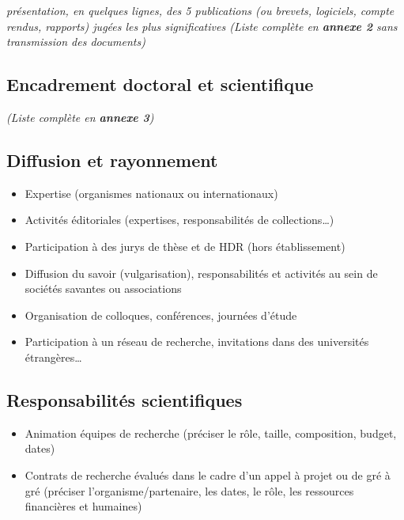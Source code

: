 \documentclass[a4paper,12pt]{article}
\newcommand{\instructions}[1]{{\color{black}#1}}
\begin{document}
\instructions{%
	{\em
	présentation, en quelques lignes, des 5 publications (ou brevets, logiciels, compte rendus, rapports) jugées les plus significatives (Liste complète en \textbf{annexe 2} sans transmission des documents)
	}
}


\subsection{Encadrement doctoral et scientifique}


\instructions{%
	{\em
	(Liste complète en \textbf{annexe 3})
	}
}


\subsection{Diffusion et rayonnement}


\instructions{%
	{\em
	\begin{itemize}
		\item Expertise (organismes nationaux ou internationaux)
		\item Activités éditoriales (expertises, responsabilités de collections…)
    	\item Participation à des jurys de thèse et de HDR (hors établissement)
    	\item Diffusion du savoir (vulgarisation), responsabilités et activités au sein de sociétés savantes ou associations
    	\item Organisation de colloques, conférences, journées d'étude
    	\item Participation à un réseau de recherche, invitations dans des universités étrangères…
	\end{itemize}

	}
}


\subsection{Responsabilités scientifiques}


\instructions{%
	{\em
	\begin{itemize}
		\item Animation équipes de recherche (préciser le rôle, taille, composition, budget, dates)
		\item Contrats de recherche évalués dans le cadre d'un appel à projet ou de gré à gré (préciser l'organisme/partenaire, les dates, le rôle, les ressources financières et humaines)
	\end{itemize}
	}
}
\end{document}
